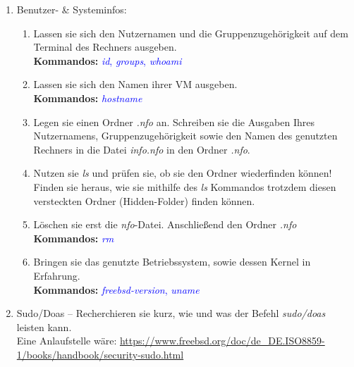 \documentclass[paper=a4,fontsize=11pt]{scrartcl}%
\numberwithin{equation}{section}
\begin{document}
\begin{enumerate}
\begin{enumerate}[label=(\alph*)]
        \textbf{Kommandos:} \textcolor{blue}{\emph{man cp}}
  	\end{enumerate}
  	\footnote{.md steht für Markdown, welches ein Format für Textdateien ist, ähnlich .pdf oder .doc-Dateien.}
\newpage        
         \item Benutzer- \& Systeminfos:
    		\begin{enumerate} [label=(\alph*)]
          \item Lassen sie sich den Nutzernamen und die Gruppenzugehörigkeit auf dem Terminal des Rechners ausgeben.\\
          \textbf{Kommandos:} \textcolor{blue}{\emph{id}, \emph{groups}, \emph{whoami}}
          \item Lassen sie sich den Namen ihrer VM ausgeben.\\
          \textbf{Kommandos:} \textcolor{blue}{\emph{hostname}}
          \item Legen sie einen Ordner \emph{.nfo} an. Schreiben sie die Ausgaben Ihres Nutzernamens, Gruppenzugehörigkeit sowie den Namen des genutzten Rechners in die Datei \emph{info.nfo} in den Ordner \emph{.nfo}.
          \item Nutzen sie \emph{ls} und prüfen sie, ob sie den Ordner wiederfinden können! Finden sie heraus, wie sie mithilfe des \emph{ls} Kommandos trotzdem diesen versteckten Ordner (Hidden-Folder) finden können.
          \item Löschen sie erst die \emph{nfo}-Datei. Anschließend den Ordner \emph{.nfo}\\
          \textbf{Kommandos:} \textcolor{blue}{\emph{rm}}
          \item Bringen sie das genutzte Betriebssystem, sowie dessen Kernel in Erfahrung.\\
          \textbf{Kommandos:} \textcolor{blue}{\emph{freebsd-version}, \emph{uname}}
        \end{enumerate}
        \item Sudo/Doas -- Recherchieren sie kurz, wie und was der Befehl \emph{sudo/doas} leisten kann.\\
        Eine Anlaufstelle wäre: \url{https://www.freebsd.org/doc/de_DE.ISO8859-1/books/handbook/security-sudo.html}
\end{enumerate}
\end{document}
